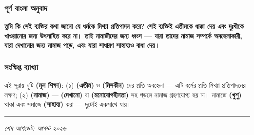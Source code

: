\subsubsection*{পূর্ণ বাংলা অনুবাদ}
\textbf{তুমি কি সেই ব্যক্তির কথা জানো যে ধর্মকে মিথ্যা প্রতিপাদন করে? সেই ব্যক্তিই এতীমকে ধাক্কা দেয় এবং দুঃখীকে খাওয়ানোর জন্য উৎসাহিত করে না। তাই নামাজীদের জন্য ধ্বংস — যারা তাদের নামাজ সম্পর্কে অবহেলাকারী, যারা দেখানোর জন্য নামাজ পড়ে, এবং যারা সাধারণ সাহায্যও বাধা দেয়।}

\subsubsection*{সংক্ষিপ্ত ব্যাখ্যা}
এই সূরায় দুটি \textbf{  (মূল শিক্ষা)}: (১) \textbf{ (এতীম)} ও \textbf{ (মিসকীন)}-দের প্রতি অবহেলা — এটি ধর্মের প্রতি মিথ্যা প্রতিপাদনের লক্ষণ; (২) \textbf{ (নামাজ)} — \textbf{ (দেখানো)} বা \textbf{ (মনোযোগহীনতা)} সহ পড়লে নামাজ গ্রহণযোগ্য হয় না। নামাজে \textbf{ (খুশু)} থাকা এবং সমাজে \textbf{ (সাহায্য)} করা — দুটোই একসাথে যায়।

\medskip\hrule\medskip

\textit{শেষ আপডেট: আগস্ট ২০২৬}


